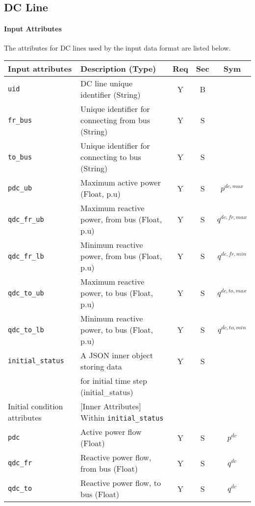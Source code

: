 \documentclass{article}
\begin{document}
\subsection{DC Line}
\label{nom:dcline}

\paragraph{Input Attributes}
The attributes for DC lines
used by the input data format are listed below.

\begin{center}
\small
\begin{tabular}{ l | l | c | c | c |}
Input attributes & Description (Type) & Req & Sec & Sym\\
\hline
  {\tt uid} & DC line unique identifier (String)& Y & B &  \\
  {\tt fr\_bus} & Unique identifier for connecting from bus (String) & Y & S & \\
  {\tt to\_bus} & Unique identifier for connecting to bus (String)& Y & S & \\
  {\tt pdc\_ub} & Maximum active power (Float, p.u)& Y & S & $p^{dc,max}$\\
  {\tt qdc\_fr\_ub} & Maximum reactive power, from bus (Float, p.u)& Y & S & $q^{dc,fr,max}$\\
  {\tt qdc\_fr\_lb} & Minimum reactive power, from bus (Float, p.u)& Y & S & $q^{dc,fr,min}$\\
  {\tt qdc\_to\_ub} & Maximum reactive power, to bus (Float, p.u)& Y & S & $q^{dc,to,max}$\\
  {\tt qdc\_to\_lb} & Minimum reactive power, to bus (Float, p.u)& Y & S & $q^{dc,to,min}$\\
  {\tt initial\_status} & A JSON inner object storing data  & Y & S &  \\
       & for initial time step (initial\_status) &  &  &  \\
  \hline
  Initial condition attributes & [Inner Attributes] Within {\tt initial\_status} & & & \\
  \hline
  {\tt pdc} & Active power flow (Float)& Y & S & $p^{dc}$ \\
  {\tt qdc\_fr} & Reactive power flow, from bus (Float)& Y & S & $q^{dc}$ \\
  {\tt qdc\_to} & Reactive power flow, to bus (Float)& Y & S & $q^{dc}$ \\
  \hline
\end{tabular}
\end{center}
\end{document}
